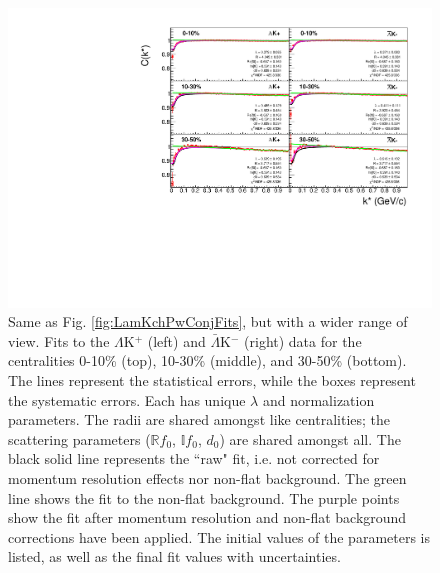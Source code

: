 \documentclass[../AnalysisNoteJBuxton.tex]{subfiles}
\begin{document}
\begin{figure}[h]
  \centering
  \includegraphics[width=\textwidth]{7_ResultsAndDiscussion/Figures/canKStarCfwFitsLamKchPwConj_0010_1030_3050UnZoomed_MomResCrctn_NonFlatBgdCrctn.pdf}
  \caption[$\Lambda$K$^{+}$($\bar{\Lambda}$K$^{-}$) Fits (Wide Range)]{Same as Fig. \ref{fig:LamKchPwConjFits}, but with a wider range of view.
Fits to the $\Lambda$K$^{+}$ (left) and $\bar{\Lambda}$K$^{-}$ (right) data for the centralities 0-10\% (top), 10-30\% (middle), and 30-50\% (bottom).
The lines represent the statistical errors, while the boxes represent the systematic errors.  
Each has unique $\lambda$ and normalization parameters.
The radii are shared amongst like centralities; the scattering parameters ($\mathbb{R}f_{0}$, $\mathbb{I}f_{0}$, $d_{0}$) are shared amongst all.
The black solid line represents the ``raw" fit, i.e. not corrected for momentum resolution effects nor non-flat background.  
The green line shows the fit to the non-flat background.
The purple points show the fit after momentum resolution and non-flat background corrections have been applied.
The initial values of the parameters is listed, as well as the final fit values with uncertainties.}
  \label{fig:LamKchPwConjFitsUnZoomed}
\end{figure}
\end{document}
